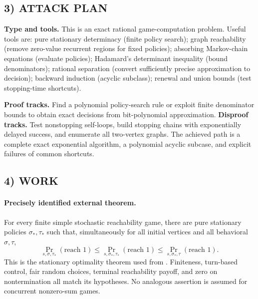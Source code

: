 \documentclass[11pt,a4paper]{article}
\theoremstyle{definition}
\theoremstyle{remark}
\begin{document}
\subsection*{3) ATTACK PLAN}
\textbf{Type and tools.} This is an exact rational game-computation problem. Useful tools are: pure stationary determinacy (finite policy search); graph reachability (remove zero-value recurrent regions for fixed policies); absorbing Markov-chain equations (evaluate policies); Hadamard's determinant inequality (bound denominators); rational separation (convert sufficiently precise approximation to decision); backward induction (acyclic subclass); renewal and union bounds (test stopping-time shortcuts).

\textbf{Proof tracks.} Find a polynomial policy-search rule or exploit finite denominator bounds to obtain exact decisions from bit-polynomial approximation. \textbf{Disproof tracks.} Test nonstopping self-loops, build stopping chains with exponentially delayed success, and enumerate all two-vertex graphs. The achieved path is a complete exact exponential algorithm, a polynomial acyclic subcase, and explicit failures of common shortcuts.

\subsection*{4) WORK}
\paragraph{Precisely identified external theorem.}
For every finite simple stochastic reachability game, there are pure stationary policies $\sigma_*,\tau_*$ such that, simultaneously for all initial vertices and all behavioral $\sigma,\tau$,
\[
 \Pr_{s,\sigma,\tau_*}(\text{reach }1)
 \leq\Pr_{s,\sigma_*,\tau_*}(\text{reach }1)
 \leq\Pr_{s,\sigma_*,\tau}(\text{reach }1).
\]
This is the stationary optimality theorem used from \cite{condon}. Finiteness, turn-based control, fair random choices, terminal reachability payoff, and zero on nontermination all match its hypotheses. No analogous assertion is assumed for concurrent nonzero-sum games.
\end{document}

